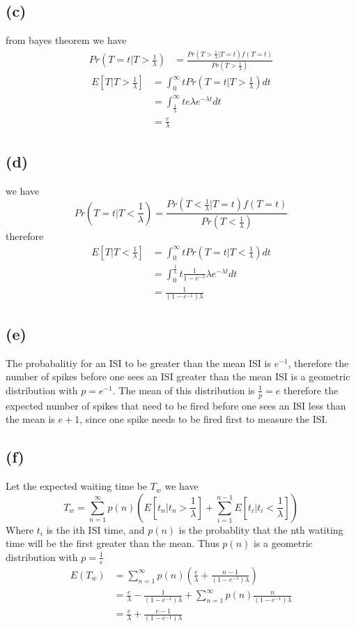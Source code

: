 \documentclass[12pt]{article}
\begin{document}
\subsection*{(c)}
from bayes theorem we have
\begin{align*}
    Pr\left(T=t|T>\frac{1}{\lambda}\right)&=\frac{Pr(T>\frac{1}{\lambda}|T=t)f(T=t)}{Pr(T>\frac{1}{\lambda})} 
\end{align*}
\begin{align*}
    E[T|T>\frac{1}{\lambda}]&=\int_{0}^{\infty}tPr\left(T=t|T>\frac{1}{\lambda}\right)dt\\
    &=\int_{\frac{1}{\lambda}}^{\infty}te \lambda e^{-\lambda t} dt\\
    &=\boxed{\frac{e}{\lambda}}
\end{align*}

\subsection*{(d)}
we have
$$Pr\left(T=t|T<\frac{1}{\lambda}\right)=\frac{Pr(T<\frac{1}{\lambda}|T=t)f(T=t)}{Pr(T<\frac{1}{\lambda})}$$
therefore
\begin{align*}
    E\left[T|T<\frac{1}{\lambda}\right]&=\int_{0}^{\infty}tPr\left(T=t|T<\frac{1}{\lambda}\right)dt\\
    &=\int_{0}^{\frac{1}{\lambda}}t\frac{1}{1-e^{-1}} \lambda e^{-\lambda t} dt\\
    &=\boxed{\frac{1}{(1-e^{-1})\lambda}}
\end{align*}
\subsection*{(e)}
The probabalitiy for an ISI to be greater than the mean ISI is $e^{-1}$, therefore the 
number of spikes before one sees an ISI greater than the mean ISI is a geometric distribution
with $p=e^{-1}$. The mean of this distribution is $\frac{1}{p}=e$ therefore the expected number of spikes
that need to be fired before one sees an ISI less than the mean is $\boxed{e+1}$, since one spike needs to be fired first to measure the ISI.
\subsection*{(f)}
Let the expected waiting time be $T_w$ we have
$$T_w=\sum_{n=1}^\infty p(n) \left(E[t_n|t_n>\frac{1}{\lambda}]+\sum_{i=1}^{n-1}E[t_i|t_i<\frac{1}{\lambda}]\right)$$
Where $t_i$ is the ith ISI time, and $p(n)$ is the probablity that the nth watiting time will be the
first greater than the mean. Thus $p(n)$ is a geometric distribution with $p=\frac{1}{e}$
\begin{align*}
    E(T_w)&=
    \sum_{n=1}^{\infty} p(n)\left(\frac{e}{\lambda}+\frac{n-1}{(1-e^{-1})\lambda}\right)\\
    &=\frac{e}{\lambda}-\frac{1}{(1-e^{-1})\lambda}+\sum_{n=1}^{\infty} p(n)\frac{n}{(1-e^{-1})\lambda}\\
    &=\boxed{\frac{e}{\lambda}+\frac{e-1}{(1-e^{-1})\lambda}}
\end{align*}
\end{document}
